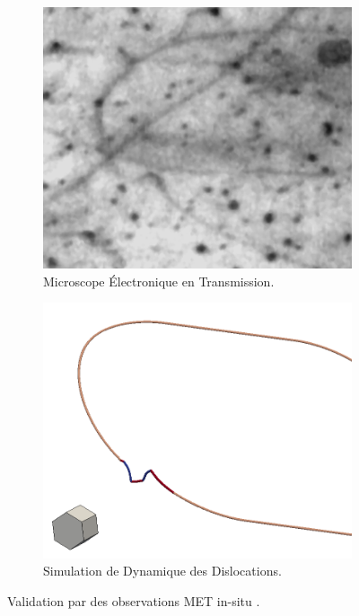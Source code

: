 \documentclass[11pt,class=article,float=false,crop=false]{standalone}
\begin{document}
\begin{figure}[H]
	\begin{subfigure}[b]{0.5\textwidth}
		\includegraphics[width=\textwidth]{img/julie-met}
		\caption{Microscope Électronique en Transmission.}
	\end{subfigure}
	\begin{subfigure}[b]{0.49\textwidth}
		\includegraphics[width=\textwidth]{img/julie-dd}
		\caption{Simulation de Dynamique des Dislocations.}
	\end{subfigure}
	\caption[Validation par des observations MET]{Validation par des observations MET in-situ .}
	\label{fig:comparaison-met-insitu}
\end{figure}
\end{document}
